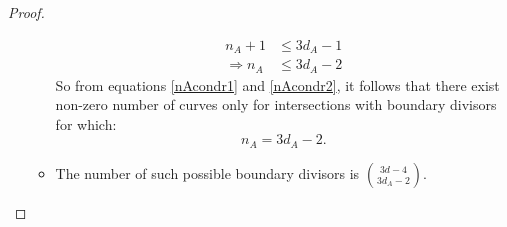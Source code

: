 \begin{proof}
\begin{enumerate}
\begin{itemize}
                    \begin{align}
                        n_{A} + 1 &\leq 3d_{A} -1 \\
                        \Rightarrow n_{A} &\leq 3d_{A} - 2 \label{nAcondr2} 
                    \end{align}
                    So from equations \ref{nAcondr1} and \ref{nAcondr2}, it follows that there exist non-zero number of curves only for intersections with boundary divisors for which:
                    \begin{equation*}
                        n_{A} = 3d_{A} - 2.
                    \end{equation*}
                \item The number of such possible boundary divisors is $\binom{3d-4}{3d_{A}-2}$.

            \end{itemize}
    \end{enumerate}
\end{proof}
